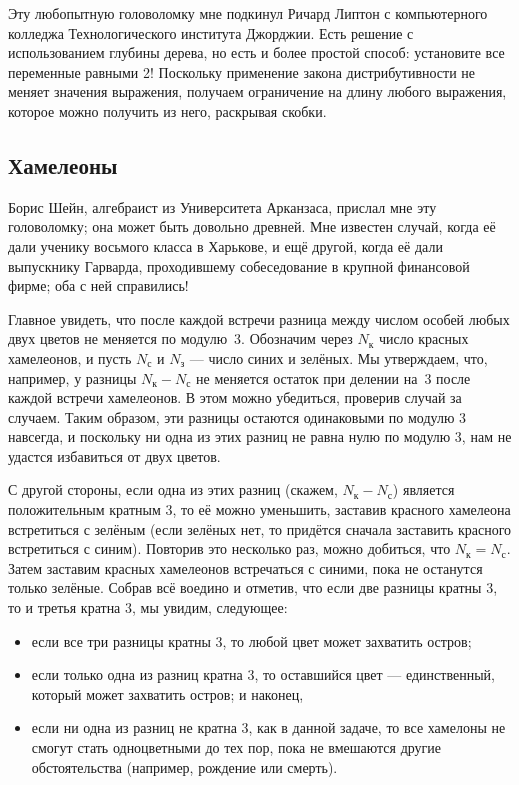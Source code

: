 Эту любопытную головоломку мне подкинул Ричард Липтон с компьютерного колледжа Технологического института Джорджии.
Есть решение с использованием глубины дерева, но есть и более простой способ:
установите все переменные равными 2!
Поскольку применение закона дистрибутивности не меняет значения выражения, получаем ограничение на длину любого выражения, которое можно получить из него, раскрывая скобки.

\subsection*{Хамелеоны}

Борис Шейн, алгебраист из Университета Арканзаса, прислал мне эту головоломку; она может быть довольно древней.
Мне известен случай, когда её дали ученику восьмого класса в Харькове,
и ещё другой, когда её дали выпускнику Гарварда, проходившему собеседование в крупной финансовой фирме;
оба с ней справились!

Главное увидеть, что после каждой встречи разница между числом особей любых двух цветов не меняется по модулю~3.
Обозначим через $N_{\text{к}}$ число красных хамелеонов, и пусть
$N_{\text{с}}$ и $N_{\text{з}}$ --- число синих и зелёных.
Мы утверждаем, что, например, у разницы $N_{\text{к}} - N_{\text{с}}$ не меняется остаток при делении на~$3$ после каждой встречи хамелеонов.
В этом можно убедиться, проверив случай за случаем.
Таким образом, эти разницы остаются одинаковыми по модулю 3 навсегда, и поскольку ни одна из этих разниц не равна нулю по модулю 3, нам не удастся избавиться от двух цветов.

С другой стороны, если одна из этих разниц (скажем, $N_{\text{к}} - N_{\text{с}}$) является положительным кратным $3$, то её можно уменьшить, заставив красного хамелеона встретиться с зелёным (если зелёных нет, то придётся сначала заставить красного встретиться с синим).
Повторив это несколько раз, можно добиться, что $N_{\text{к}} = N_{\text{с}}$.
Затем заставим красных хамелеонов встречаться с синими, пока не останутся только зелёные.
Собрав всё воедино и отметив, что если две разницы кратны $3$, то и третья кратна $3$, мы увидим, следующее:
\begin{itemize}
\item если все три разницы кратны 3, то любой цвет может захватить остров;
\item если только одна из разниц кратна 3, то оставшийся цвет --- единственный, который может захватить остров; и наконец,
\item если ни одна из разниц не кратна 3, как в данной задаче, то все хамелоны не смогут стать одноцветными до тех пор, пока не вмешаются другие обстоятельства (например, рождение или смерть).
\end{itemize}

